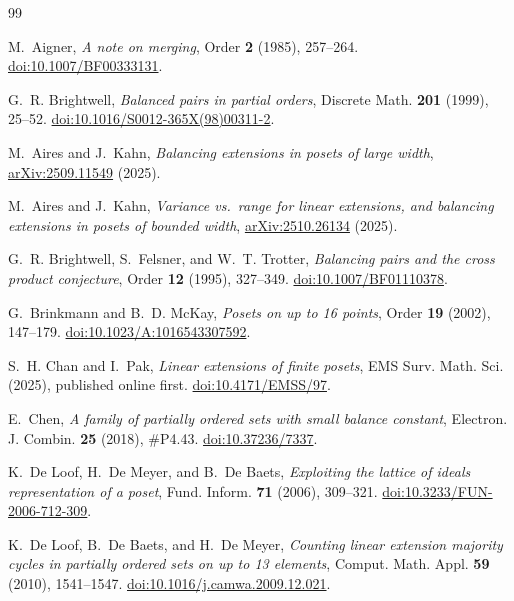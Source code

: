 \documentclass[11pt]{article}
\theoremstyle{definition}
\begin{document}
\begin{thebibliography}{99}

M.~Aigner,
\emph{A note on merging},
Order \textbf{2} (1985), 257--264.
\href{https://doi.org/10.1007/BF00333131}{doi:10.1007/BF00333131}.

G.~R. Brightwell,
\emph{Balanced pairs in partial orders},
Discrete Math. \textbf{201} (1999), 25--52.
\href{https://doi.org/10.1016/S0012-365X(98)00311-2}
{doi:10.1016/S0012-365X(98)00311-2}.

M.~Aires and J.~Kahn,
\emph{Balancing extensions in posets of large width},
\href{https://doi.org/10.48550/arXiv.2509.11549}
{arXiv:2509.11549} (2025).

M.~Aires and J.~Kahn,
\emph{Variance vs.\ range for linear extensions, and balancing extensions in
posets of bounded width},
\href{https://doi.org/10.48550/arXiv.2510.26134}
{arXiv:2510.26134} (2025).

G.~R. Brightwell, S.~Felsner, and W.~T. Trotter,
\emph{Balancing pairs and the cross product conjecture},
Order \textbf{12} (1995), 327--349.
\href{https://doi.org/10.1007/BF01110378}{doi:10.1007/BF01110378}.

G.~Brinkmann and B.~D. McKay,
\emph{Posets on up to 16 points},
Order \textbf{19} (2002), 147--179.
\href{https://doi.org/10.1023/A:1016543307592}
{doi:10.1023/A:1016543307592}.

S.~H. Chan and I.~Pak,
\emph{Linear extensions of finite posets},
EMS Surv. Math. Sci. (2025), published online first.
\href{https://doi.org/10.4171/EMSS/97}{doi:10.4171/EMSS/97}.

E.~Chen,
\emph{A family of partially ordered sets with small balance constant},
Electron. J. Combin. \textbf{25} (2018), \#P4.43.
\href{https://doi.org/10.37236/7337}{doi:10.37236/7337}.

K.~De Loof, H.~De Meyer, and B.~De Baets,
\emph{Exploiting the lattice of ideals representation of a poset},
Fund. Inform. \textbf{71} (2006), 309--321.
\href{https://doi.org/10.3233/FUN-2006-712-309}
{doi:10.3233/FUN-2006-712-309}.

K.~De Loof, B.~De Baets, and H.~De Meyer,
\emph{Counting linear extension majority cycles in partially ordered sets
on up to 13 elements},
Comput. Math. Appl. \textbf{59} (2010), 1541--1547.
\href{https://doi.org/10.1016/j.camwa.2009.12.021}
{doi:10.1016/j.camwa.2009.12.021}.


\end{thebibliography}
\end{document}
